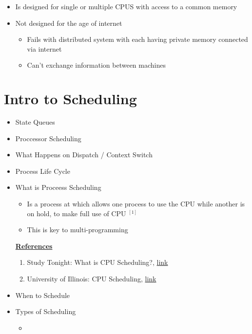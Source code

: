 \documentclass[12pt]{article}
\begin{document}
\begin{itemize}
\begin{itemize}
\begin{itemize}
\begin{itemize}
            \end{itemize}
            \item Is designed for single or multiple CPUS with access to a common
            memory
            \item Not designed for the age of internet
            \begin{itemize}
                \item Fails with distributed system with each having private memory
                connected via internet
                \item Can't exchange information between machines
            \end{itemize}
        \end{itemize}
    \end{itemize}
\end{itemize}

\bigskip

\section{Intro to Scheduling}

\bigskip

\begin{itemize}
    \item State Queues
    \item Proccessor Scheduling
    \item What Happens on Dispatch / Context Switch
    \item Process Life Cycle
    \item What is Proceess Scheduling
    \begin{itemize}
        \item Is a process at which allows one process to use the CPU while
        another is on hold, to make full use of CPU $^{[1]}$
        \item This is key to multi-programming
    \end{itemize}

    \bigskip

    \underline{\textbf{References}}

    \bigskip

    \begin{enumerate}[1)]
        \item Study Tonight: What is CPU Scheduling?, \href{https://www.studytonight.com/operating-system/cpu-scheduling}{link}
        \item University of Illinois: CPU Scheduling, \href{https://www.cs.uic.edu/~jbell/CourseNotes/OperatingSystems/6_CPU_Scheduling.html}{link}
    \end{enumerate}

    \item When to Schedule
    \item Types of Scheduling
    \begin{itemize}
        \item
    \end{itemize}
\end{itemize}
\end{document}
